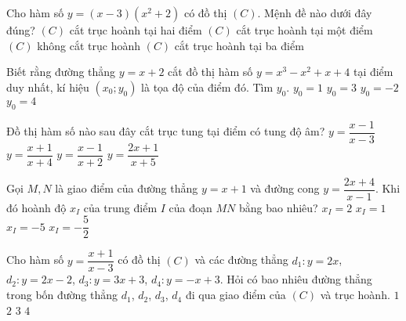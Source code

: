 \begin{ex}%
	Cho hàm số $y=(x-3)\left(x^2+2\right)$ có đồ thị $(C)$. Mệnh đề nào dưới đây đúng?
	\choice
	{$(C)$ cắt trục hoành tại hai điểm}
	{\True $(C)$ cắt trục hoành tại một điểm}
	{$(C)$ không cắt trục hoành}
	{$(C)$ cắt trục hoành tại ba điểm}
\end{ex}

\begin{ex}%
	Biết rằng đường thẳng $y=x+2$ cắt đồ thị hàm số $y=x^3-x^2+x+4$ tại điểm duy nhất, kí hiệu $(x_0;y_0)$ là tọa độ của điểm đó. Tìm $y_0$.
	\choice
	{\True $y_0=1$}
	{$y_0=3$}
	{$y_0=-2$}
	{$y_0=4$}
\end{ex}

\begin{ex}%
	Đồ thị hàm số nào sau đây cắt trục tung tại điểm có tung độ âm?
	\choice
	{$y=\dfrac{x-1}{x-3}$}
	{$y=\dfrac{x+1}{x+4}$}
	{\True $y=\dfrac{x-1}{x+2}$}
	{$y=\dfrac{2x+1}{x+5}$}
\end{ex}

\begin{ex}%
	Gọi $M,N$ là giao điểm của đường thẳng $y=x+1$ và đường cong $y=\dfrac{2x+4}{x-1}$. Khi đó hoành độ $x_I$ của trung điểm $I$ của đoạn $MN$ bằng bao nhiêu?
	\choice
	{$x_I=2$}
	{\True $x_I=1$}
	{$x_I=-5$}
	{$x_I=-\dfrac{5}{2}$}
\end{ex}

\begin{ex}%
	Cho hàm số $y=\dfrac{x+1}{x-3}$ có đồ thị $(C)$ và các đường thẳng $d_1\colon y=2x$, $d_2\colon y=2x-2$, $d_3\colon y=3x+3$, $d_4\colon y=-x+3$. Hỏi có bao nhiêu đường thẳng trong bốn đường thẳng $d_1$, $d_2$, $d_3$, $d_4$ đi qua giao điểm của $(C)$ và trục hoành.
	\choice
	{\True $1$}
	{$2$}
	{$3$}
	{$4$}
\end{ex}

